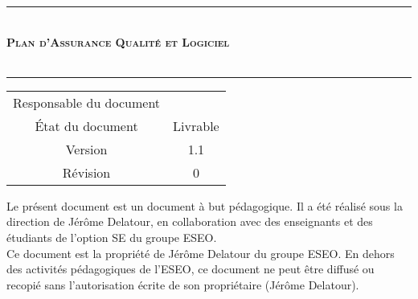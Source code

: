 \documentclass[a4paper,11pt,titlepage]{article}
\newcommand{\version}{1.1}
\newcommand{\revision}{0}
\newcommand{\documentName}{Plan d'Assurance Qualité et Logiciel}
\newcommand{\creator}{\RQT}
\begin{document}

\sloppy%
\renewcommand{\arraystretch}{1.1}


\vspace{-2cm}%
\begin{center}%
    \vspace*{1cm}
    \rule[0.5ex]{0.4\textwidth}{0.1mm}\\
    \vspace*{2mm}
    {\Huge {\textsc{\bf {\documentName}}}}
    \vspace{0.4cm}\\
    {\large\bf {\teamName}}\\
    {\large\bf {\projectName}}

    \rule[0.5ex]{0.4\textwidth}{0.1mm}

    \vspace{1cm}

\end{center}
\begin{center}
    \begin{tabular}{|c|c|}
        \hline
        Responsable du document & {\creator}            \\
        État du document        & Livrable              \\
        Version                 & {\version}            \\
        Révision                & {\revision}           \\
        \hline
    \end{tabular}
\end{center}

\vspace{2cm}
Le présent document est un document à but pédagogique. Il a été réalisé sous la direction de Jérôme Delatour, en collaboration avec des enseignants et des étudiants de l'option SE du groupe ESEO. \\

Ce document est la propriété de Jérôme Delatour du groupe ESEO. En dehors des activités pédagogiques de l'ESEO, ce document ne peut être diffusé ou recopié sans l’autorisation écrite de son propriétaire (Jérôme Delatour).
\newpage



\newpage

\end{document}
